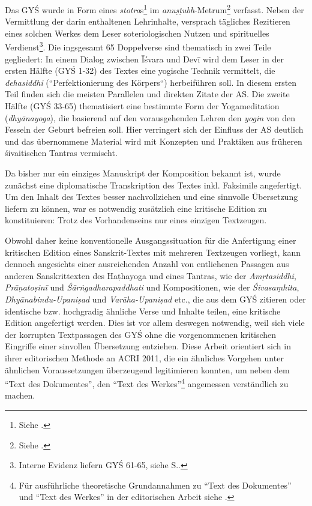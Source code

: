\documentclass[a4paper,12pt]{article}
\begin{document}
Das GYŚ wurde in Form eines \textit{stotra}s\footnote{Siehe \parencite[193-205]{jacobson2010}.} im \textit{anuṣṭubh}-Metrum\footnote{Siehe \parencite{apte1957}.} verfasst. Neben der Vermittlung der darin enthaltenen Lehrinhalte, versprach tägliches Rezitieren eines solchen Werkes dem Leser soteriologischen Nutzen und spirituelles Verdienst\footnote{Interne Evidenz liefern GYŚ 61-65, siehe S.\pageref{verdienst}.}. Die ingsgesamt 65 Doppelverse sind thematisch in zwei Teile gegliedert: In einem Dialog zwischen Īśvara und Devī wird dem Leser in der ersten Hälfte (GYŚ 1-32) des Textes eine yogische Technik vermittelt, die \textit{dehasiddhi} (``Perfektionierung des Körpers“) herbeiführen soll. In diesem ersten Teil finden sich die meisten Parallelen und direkten Zitate der AS. Die zweite Hälfte (GYŚ 33-65) thematisiert eine bestimmte Form der Yogameditation (\textit{dhyānayoga}), die basierend auf den vorausgehenden Lehren den \textit{yogin} von den Fesseln der Geburt befreien soll. Hier verringert sich der Einfluss der AS deutlich und das übernommene Material wird mit Konzepten und Praktiken aus früheren śivaitischen Tantras vermischt. 

Da bisher nur ein einziges Manuskript der Komposition bekannt ist, wurde zunächst eine diplomatische Transkription des Textes inkl. Faksimile angefertigt. Um den Inhalt des Textes besser nachvollziehen und eine sinnvolle Übersetzung liefern zu können, war es notwendig zusätzlich eine kritische Edition zu konstituieren: Trotz des Vorhandenseins nur eines einzigen Textzeugen.

Obwohl daher keine konventionelle Ausgangssituation für die Anfertigung einer kritischen Edition eines Sanskrit-Textes mit mehreren Textzeugen vorliegt, kann dennoch angesichts einer ausreichenden Anzahl von entliehenen Passagen aus anderen Sanskrittexten des Haṭhayoga und eines Tantras, wie der \textit{Amṛtasiddhi}, \textit{Prāṇatoṣinī} und \textit{Śārṅgadharapaddhati} und Kompositionen, wie der \textit{Śivasaṃhita}, \textit{Dhyānabindu-Upaniṣad} und \textit{Varāha-Upaniṣad} etc., die aus dem GYŚ zitieren oder identische bzw. hochgradig ähnliche Verse und Inhalte teilen, eine kritische Edition angefertigt werden. Dies ist vor allem deswegen notwendig, weil sich viele der korrupten Textpassagen des GYŚ ohne die vorgenommenen kritischen Eingriffe einer sinvollen Übersetzung entziehen. Diese Arbeit orientiert sich in ihrer editorischen Methode an ACRI 2011, die ein ähnliches Vorgehen unter ähnlichen Voraussetzungen überzeugend legitimieren konnten, um neben dem ``Text des Dokumentes'', den ``Text des Werkes''\footnote{Für ausführliche theoretische Grundannahmen zu  ``Text des Dokumentes'' und ``Text des Werkes'' in der editorischen Arbeit siehe \parencite[insb. Kapitel 1]{tanselle1989}.} angemessen verständlich zu machen.
\end{document}
